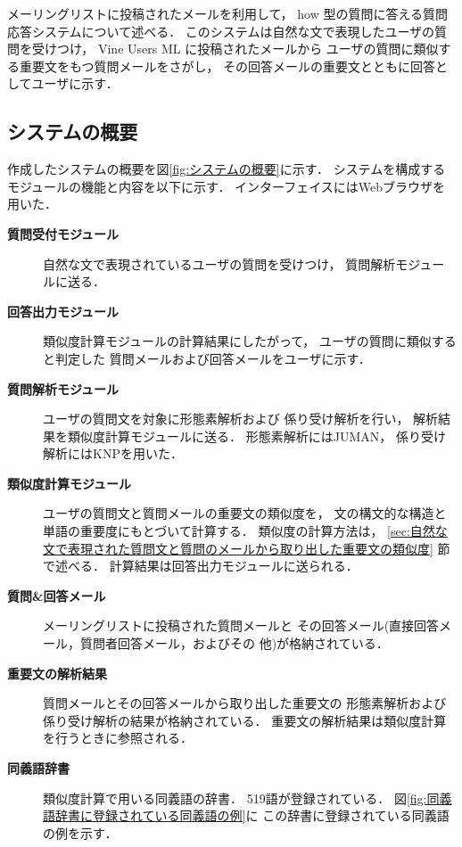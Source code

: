  メーリングリストに投稿されたメールを利用して，
 how 型の質問に答える質問応答システムについて述べる．
 このシステムは自然な文で表現したユーザの質問を受けつけ，
 Vine Users ML に投稿されたメールから
 ユーザの質問に類似する重要文をもつ質問メールをさがし，
 その回答メールの重要文とともに回答としてユーザに示す．

\subsection{システムの概要}

作成したシステムの概要を図\ref{fig:システムの概要}に示す．
システムを構成するモジュールの機能と内容を以下に示す．
インターフェイスにはWebブラウザを用いた．

\begin{description}
 \item[{\bf 質問受付モジュール}] 自然な文で表現されているユーザの質問を受けつけ，
	    質問解析モジュールに送る．

 \item[{\bf 回答出力モジュール}] 類似度計算モジュールの計算結果にしたがって，
	    ユーザの質問に類似すると判定した
	    質問メールおよび回答メールをユーザに示す．

 \item[{\bf 質問解析モジュール}] ユーザの質問文を対象に形態素解析および
	    係り受け解析を行い，
	    解析結果を類似度計算モジュールに送る．
	    形態素解析にはJUMAN\cite{man:juman98}，
	    係り受け解析にはKNP\cite{man:knp98}を用いた．

 \item[{\bf 類似度計算モジュール}] ユーザの質問文と質問メールの重要文の類似度を，
	    文の構文的な構造と単語の重要度にもとづいて計算する．
	    類似度の計算方法は，
	    \ref{sec:自然な文で表現された質問文と質問のメールから取り出した重要文の類似度}
	    節で述べる．
	    計算結果は回答出力モジュールに送られる．

 \item[{\bf 質問\&回答メール}] メーリングリストに投稿された質問メールと
	    その回答メール(直接回答メール，質問者回答メール，およびその
	    他)が格納されている．

 \item[{\bf 重要文の解析結果}] 質問メールとその回答メールから取り出した重要文の
	    形態素解析および係り受け解析の結果が格納されている．
	    重要文の解析結果は類似度計算を行うときに参照される．

 \item[{\bf 同義語辞書}] 類似度計算で用いる同義語の辞書．
	    519語が登録されている．
	    図\ref{fig:同義語辞書に登録されている同義語の例}に
	    この辞書に登録されている同義語の例を示す．
    


\end{description}
